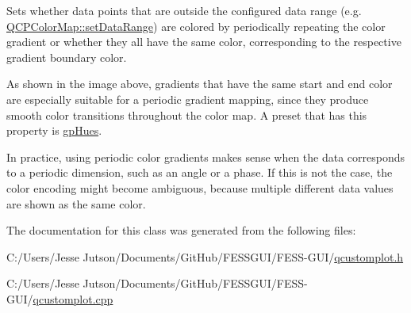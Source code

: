 Sets whether data points that are outside the configured data range (e.\+g. \hyperlink{class_q_c_p_color_map_a980b42837821159786a85b4b7dcb8774}{Q\+C\+P\+Color\+Map\+::set\+Data\+Range}) are colored by periodically repeating the color gradient or whether they all have the same color, corresponding to the respective gradient boundary color.



As shown in the image above, gradients that have the same start and end color are especially suitable for a periodic gradient mapping, since they produce smooth color transitions throughout the color map. A preset that has this property is \hyperlink{class_q_c_p_color_gradient_aed6569828fee337023670272910c9072a30efe58407acfb67939032f70213a130}{gp\+Hues}.

In practice, using periodic color gradients makes sense when the data corresponds to a periodic dimension, such as an angle or a phase. If this is not the case, the color encoding might become ambiguous, because multiple different data values are shown as the same color. 

The documentation for this class was generated from the following files\+:\begin{DoxyCompactItemize}
\item 
C\+:/\+Users/\+Jesse Jutson/\+Documents/\+Git\+Hub/\+F\+E\+S\+S\+G\+U\+I/\+F\+E\+S\+S-\/\+G\+U\+I/\hyperlink{qcustomplot_8h}{qcustomplot.\+h}\item 
C\+:/\+Users/\+Jesse Jutson/\+Documents/\+Git\+Hub/\+F\+E\+S\+S\+G\+U\+I/\+F\+E\+S\+S-\/\+G\+U\+I/\hyperlink{qcustomplot_8cpp}{qcustomplot.\+cpp}\end{DoxyCompactItemize}
